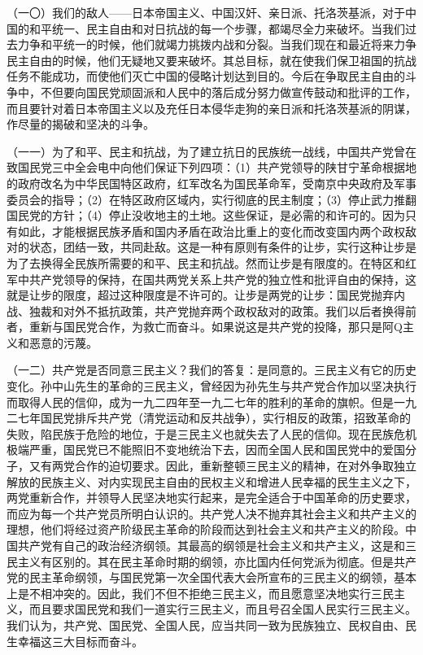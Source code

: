 （一〇）我们的敌人——日本帝国主义、中国汉奸、亲日派、托洛茨基派，对于中国的和平统一、民主自由和对日抗战的每一个步骤，都竭尽全力来破坏。当我们过去力争和平统一的时候，他们就竭力挑拨内战和分裂。当我们现在和最近将来力争民主自由的时候，他们无疑地又要来破坏。其总目标，就在使我们保卫祖国的抗战任务不能成功，而使他们灭亡中国的侵略计划达到目的。今后在争取民主自由的斗争中，不但要向国民党顽固派和人民中的落后成分努力做宣传鼓动和批评的工作，而且要针对着日本帝国主义以及充任日本侵华走狗的亲日派和托洛茨基派的阴谋，作尽量的揭破和坚决的斗争。

（一一）为了和平、民主和抗战，为了建立抗日的民族统一战线，中国共产党曾在致国民党三中全会电中向他们保证下列四项：（1）共产党领导的陕甘宁革命根据地的政府改名为中华民国特区政府，红军改名为国民革命军，受南京中央政府及军事委员会的指导；（2）在特区政府区域内，实行彻底的民主制度；（3）停止武力推翻国民党的方针；（4）停止没收地主的土地。这些保证，是必需的和许可的。因为只有如此，才能根据民族矛盾和国内矛盾在政治比重上的变化而改变国内两个政权敌对的状态，团结一致，共同赴敌。这是一种有原则有条件的让步，实行这种让步是为了去换得全民族所需要的和平、民主和抗战。然而让步是有限度的。在特区和红军中共产党领导的保持，在国共两党关系上共产党的独立性和批评自由的保持，这就是让步的限度，超过这种限度是不许可的。让步是两党的让步：国民党抛弃内战、独裁和对外不抵抗政策，共产党抛弃两个政权敌对的政策。我们以后者换得前者，重新与国民党合作，为救亡而奋斗。如果说这是共产党的投降，那只是阿Q主义和恶意的污蔑。

（一二）共产党是否同意三民主义？我们的答复：是同意的。三民主义有它的历史变化。孙中山先生的革命的三民主义，曾经因为孙先生与共产党合作加以坚决执行而取得人民的信仰，成为一九二四年至一九二七年的胜利的革命的旗帜。但是一九二七年国民党排斥共产党（清党运动和反共战争），实行相反的政策，招致革命的失败，陷民族于危险的地位，于是三民主义也就失去了人民的信仰。现在民族危机极端严重，国民党已不能照旧不变地统治下去，因而全国人民和国民党中的爱国分子，又有两党合作的迫切要求。因此，重新整顿三民主义的精神，在对外争取独立解放的民族主义、对内实现民主自由的民权主义和增进人民幸福的民生主义之下，两党重新合作，并领导人民坚决地实行起来，是完全适合于中国革命的历史要求，而应为每一个共产党员所明白认识的。共产党人决不抛弃其社会主义和共产主义的理想，他们将经过资产阶级民主革命的阶段而达到社会主义和共产主义的阶段。中国共产党有自己的政治经济纲领。其最高的纲领是社会主义和共产主义，这是和三民主义有区别的。其在民主革命时期的纲领，亦比国内任何党派为彻底。但是共产党的民主革命纲领，与国民党第一次全国代表大会所宣布的三民主义的纲领，基本上是不相冲突的。因此，我们不但不拒绝三民主义，而且愿意坚决地实行三民主义，而且要求国民党和我们一道实行三民主义，而且号召全国人民实行三民主义。我们认为，共产党、国民党、全国人民，应当共同一致为民族独立、民权自由、民生幸福这三大目标而奋斗。

